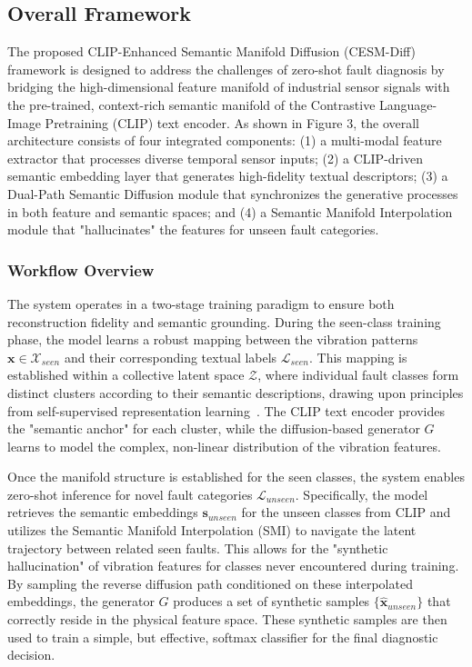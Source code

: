 \subsection{Overall Framework}
\label{sec:framework}

The proposed CLIP-Enhanced Semantic Manifold Diffusion (CESM-Diff) framework is designed to address the challenges of zero-shot fault diagnosis by bridging the high-dimensional feature manifold of industrial sensor signals with the pre-trained, context-rich semantic manifold of the Contrastive Language-Image Pretraining (CLIP) text encoder. As shown in Figure 3, the overall architecture consists of four integrated components: (1) a multi-modal feature extractor that processes diverse temporal sensor inputs; (2) a CLIP-driven semantic embedding layer that generates high-fidelity textual descriptors; (3) a Dual-Path Semantic Diffusion module that synchronizes the generative processes in both feature and semantic spaces; and (4) a Semantic Manifold Interpolation module that "hallucinates" the features for unseen fault categories.

\subsubsection{Workflow Overview}
The system operates in a two-stage training paradigm to ensure both reconstruction fidelity and semantic grounding. During the seen-class training phase, the model learns a robust mapping between the vibration patterns $\mathbf{x} \in \mathcal{X}_{seen}$ and their corresponding textual labels $\mathcal{L}_{seen}$. This mapping is established within a collective latent space $\mathcal{Z}$, where individual fault classes form distinct clusters according to their semantic descriptions, drawing upon principles from self-supervised representation learning~\cite{bardes2021vicreg,caron2021dino,chen2021mocov3}. The CLIP text encoder provides the "semantic anchor" for each cluster, while the diffusion-based generator $G$ learns to model the complex, non-linear distribution of the vibration features.

Once the manifold structure is established for the seen classes, the system enables zero-shot inference for novel fault categories $\mathcal{L}_{unseen}$. Specifically, the model retrieves the semantic embeddings $\mathbf{s}_{unseen}$ for the unseen classes from CLIP and utilizes the Semantic Manifold Interpolation (SMI) to navigate the latent trajectory between related seen faults. This allows for the "synthetic hallucination" of vibration features for classes never encountered during training. By sampling the reverse diffusion path conditioned on these interpolated embeddings, the generator $G$ produces a set of synthetic samples $\{\hat{\mathbf{x}}_{unseen}\}$ that correctly reside in the physical feature space. These synthetic samples are then used to train a simple, but effective, softmax classifier for the final diagnostic decision.

